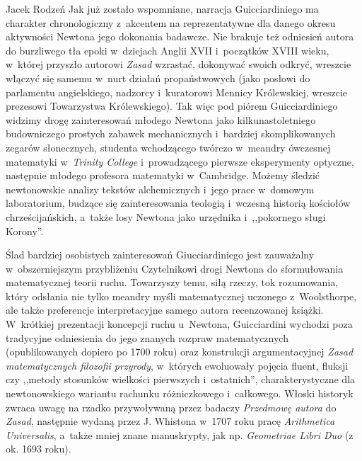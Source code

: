 \begin{recplenv}{Jacek Rodzeń}
Jak już zostało wspomniane, narracja Guicciardiniego ma charakter chronologiczny z~akcentem na reprezentatywne dla
danego okresu aktywności Newtona jego dokonania badawcze. Nie brakuje też odniesień autora do burzliwego tła
epoki w~dziejach Anglii XVII i~początków XVIII wieku, w~której przyszło autorowi \textit{Zasad} wzrastać, dokonywać swoich
odkryć, wreszcie włączyć się samemu w~nurt działań propaństwowych (jako posłowi do parlamentu angielskiego,
nadzorcy i~kuratorowi Mennicy Królewskiej, wreszcie prezesowi Towarzystwa Królewskiego). Tak więc pod piórem Guicciardiniego
widzimy drogę zainteresowań młodego Newtona jako kilkunastoletniego budowniczego prostych zabawek
mechanicznych i~bardziej skomplikowanych zegarów słonecznych, studenta wchodzącego twórczo w~meandry ówczesnej
matematyki w~\textit{Trinity College} i~prowadzącego pierwsze eksperymenty optyczne, następnie młodego profesora
matematyki w~Cambridge. Możemy śledzić newtonowskie analizy tekstów alchemicznych i~jego prace w~domowym
laboratorium, budzące się
zainteresowania teologią i~wczesną historią kościołów chrześcijańskich, a~także losy Newtona jako
urzędnika i~,,pokornego sługi Korony''.

Ślad bardziej osobistych zainteresowań Giucciardiniego jest zauważalny w~obszerniejszym przybliżeniu Czytelnikowi
drogi Newtona do sformułowania matematycznej teorii ruchu. Towarzyszy temu, siłą rzeczy, tok rozumowania, który
odsłania nie tylko meandry myśli matematycznej uczonego z~Woolsthorpe, ale także preferencje interpretacyjne samego
autora recenzowanej książki. W~krótkiej prezentacji koncepcji ruchu u~Newtona, Guicciardini wychodzi poza tradycyjne
odniesienia do jego znanych rozpraw matematycznych (opublikowanych dopiero po 1700 roku) oraz konstrukcji
argumentacyjnej \textit{Zasad matematycznych filozofii przyrody}, w~których ewoluowały pojęcia fluent, fluksji czy
,,metody stosunków wielkości pierwszych i~ostatnich'', charakterystyczne dla newtonowskiego wariantu rachunku
różniczkowego i~całkowego. Włoski historyk zwraca uwagę na rzadko przywoływaną przez badaczy \textit{Przedmowę autora}
do \textit{Zasad}, następnie wydaną przez J. Whistona w~1707 roku pracę \textit{Arithmetica Universalis}, a~także mniej
znane manuskrypty, jak np. \textit{Geometriae Libri Duo }(z ok. 1693 roku). 


\end{recplenv}
